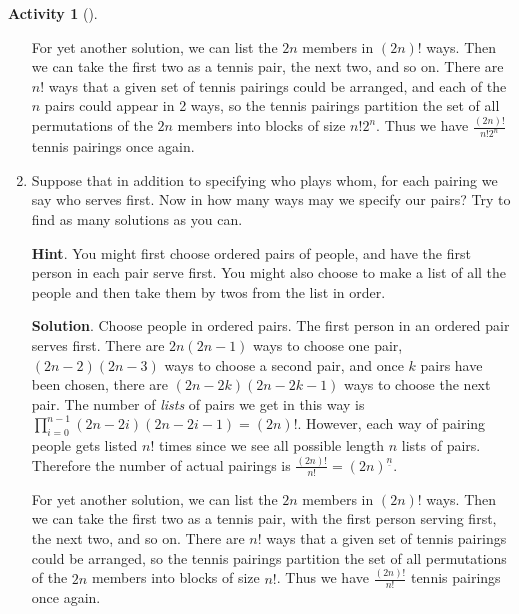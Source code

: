 \documentclass[10pt,]{book}
\theoremstyle{plain}
\theoremstyle{definition}
\theoremstyle{definition}
\theoremstyle{definition}
\newtheorem{activity}[project]{Activity}
\numberwithin{equation}{chapter}
\begin{document}
\begin{activity}[]
\begin{enumerate}[font=\bfseries,label=(\alph*),ref=\alph*]
\par
\hypertarget{p-776}{}%
For yet another solution, we can list the \(2n\) members in \((2n)!\) ways. Then we can take the first two as a tennis pair, the next two, and so on. There are \(n!\) ways that a given set of tennis pairings could be arranged, and each of the \(n\) pairs could appear in 2 ways, so the tennis pairings partition the set of all permutations of the \(2n\) members into blocks of size \(n!2^n\). Thus we have \(\frac{(2n)!}{n!2^n}\) tennis pairings once again.%
\item\label{task-146} \hypertarget{p-777}{}%
Suppose that in addition to specifying who plays whom, for each pairing we say who serves first.  Now in how many ways may we specify our pairs? Try to find as many solutions as you can.%
\par\smallskip%
\noindent\textbf{Hint}.\hypertarget{hint-68}{}\quad%
\hypertarget{p-778}{}%
You might first choose ordered pairs of people, and have the first person in each pair serve first. You might also choose to make a list of all the people and then take them by twos from the list in order.%
\par\smallskip%
\noindent\textbf{Solution}.\hypertarget{solution-59}{}\quad%
\hypertarget{p-779}{}%
Choose people in ordered pairs.  The first person in an ordered pair serves first.  There are \(2n(2n-1)\) ways to choose one pair, \((2n-2)(2n-3)\) ways to choose a second pair, and once \(k\) pairs have been chosen, there are \((2n-2k)(2n-2k-1)\) ways to choose the next pair.  The number of \emph{lists} of pairs we get in this way is \(\prod_{i=0}^{n-1} (2n-2i)(2n-2i-1) = (2n)!\). However, each way of pairing people gets listed \(n!\) times since we see all possible length \(n\) lists of pairs.  Therefore the number of actual pairings is \(\frac{(2n)!}{n!} = (2n)^{\underline{n}}\).%
\par
\hypertarget{p-780}{}%
For yet another solution, we can list the \(2n\) members in \((2n)!\) ways. Then we can take the first two as a tennis pair, with the first person serving first, the next two, and so on. There are \(n!\) ways that a given set of tennis pairings could be arranged, so the tennis pairings partition the set of all permutations of the \(2n\) members into blocks of size \(n!\). Thus we have \(\frac{(2n)!}{n!}\) tennis pairings once again.%
\end{enumerate}
\end{activity}
\end{document}
